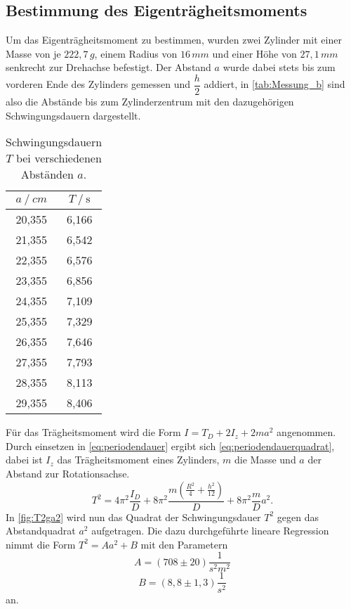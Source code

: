 \subsection{Bestimmung des Eigenträgheitsmoments}
\label{subsec:b}
Um das Eigenträgheitsmoment zu bestimmen, wurden zwei Zylinder mit einer Masse von je $222,7 \,\unit{g}$, einem Radius von $16 \,\unit{mm}$ und einer Höhe von $27,1 \,\unit{mm}$ senkrecht zur Drehachse befestigt.
Der Abstand $a$ wurde dabei stets bis zum vorderen Ende des Zylinders gemessen und $\dfrac{h}{2}$ addiert, in \autoref{tab:Messung_b} 
sind also die Abstände bis zum Zylinderzentrum mit den dazugehörigen Schwingungsdauern dargestellt.

\begin{table}[H] %
  \centering
  \begin{tabular}{S[table-format=2.3] S[table-format=2.2]}
      \toprule
      {$a \mathbin{/}\unit{cm}$} & {$T \mathbin{/} \unit{\second}$}\\
      ,355 & 6,166 \\
           21,355 & 6,542 \\
           22,355 & 6,576 \\
           23,355 & 6,856 \\  
           24,355 & 7,109 \\
           25,355 & 7,329 \\
           26,355 & 7,646 \\
           27,355 & 7,793 \\
           28,355 & 8,113 \\
           29,355 & 8,406 \\
      \bottomrule
  \end{tabular}
  \caption{Schwingungsdauern $T$ bei verschiedenen Abständen $a$.}
  \label{tab:Messung_b}
\end{table}
Für das Trägheitsmoment wird die Form $ I = T_D + 2I_z + 2m a^2$ angenommen. 
Durch einsetzen in \eqref{eq:periodendauer} ergibt sich \eqref{eq:periodendauerquadrat}, dabei ist $I_z$ das Trägheitsmoment eines Zylinders, $m$ die Masse und $a$ der Abstand zur Rotationsachse.
\begin{equation}
  T^2 = 4 \pi^2 \frac{I_D}{D} + 8 \pi^2 \frac{m (\frac{R^2}{4} + \frac{h^2}{12})}{D}+ 8 \pi^2 \frac{m}{D} a^2 .
  \label{eq:periodendauerquadrat}
\end{equation}
In \autoref{fig:T2ga2} wird nun das Quadrat der Schwingungsdauer $T^2$ gegen das Abstandquadrat $a^2$ aufgetragen.
Die dazu durchgeführte lineare Regression nimmt die Form $T^2 = A  a^2 + B $ mit den Parametern
\begin{equation*}
  A = (708 \pm 20) \dfrac{1}{s^2m^2}
\end{equation*}
\begin{equation*}
 B = (8,8 \pm 1,3) \dfrac{1}{s^2} 
\end{equation*}
an.


